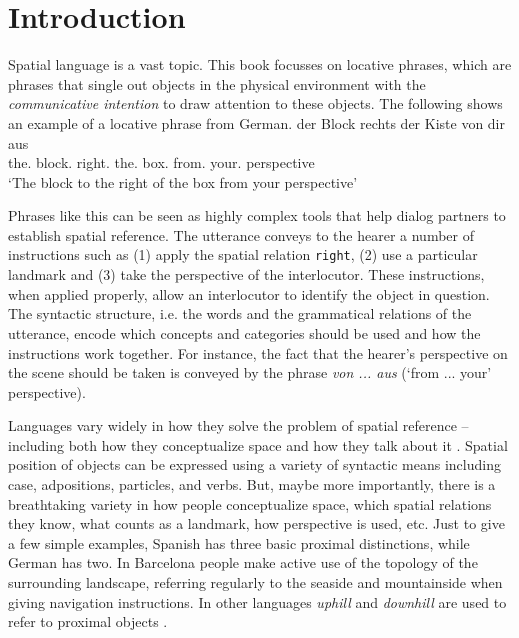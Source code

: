 % 

\chapter{Introduction}
Spatial language is a vast topic. This book focusses on locative phrases, 
which are phrases that single out objects in the physical environment with the 
\emph{communicative intention} 
to draw attention to these objects. The following shows an example
of a locative phrase from German.
\ea
\label{e:der-block-rechts-der-kiste-von-dir-aus}
\gll der Block rechts der Kiste von dir aus \\
the.{\NOM} block.{\NOM} right.{\PREP} the.{\GEN} box.{\GEN} from.{\PREP} your.{\DAT} perspective \\
\glt `The block to the right of the box from your perspective'\\
\z

Phrases like this can be seen as highly complex tools that help dialog 
partners to establish spatial reference. The utterance conveys to the hearer 
a number of instructions such as (1) apply the spatial relation {\footnotesize\tt right},
(2) use a particular landmark and (3) take the perspective of the interlocutor.
These instructions, when applied properly, allow an interlocutor 
to identify the object in question. The syntactic structure, i.e. the words and the 
grammatical relations of the utterance, encode
which concepts and categories should be used and how the instructions work together. 
For instance, the fact that the hearer's perspective on the scene should be taken
is conveyed by the phrase \textit{von ... aus} (`from ... your' perspective).

Languages vary widely in how they solve the problem of spatial reference --
including both how they conceptualize space and how they
talk about it \citep{levinson2006grammars,levinson2003space}. 
Spatial position of objects can be expressed using 
a variety of syntactic means including case, 
adpositions, particles, and verbs. But, maybe more importantly, 
there is a breathtaking variety in how people conceptualize space,
which spatial relations they know, what counts as a landmark, how
perspective is used, etc. Just to give a few simple examples, Spanish has
three basic proximal distinctions, while German has two.
In Barcelona people make active use of the topology of
the surrounding landscape, referring regularly to the
seaside and mountainside when giving navigation instructions. 
In other languages \emph{uphill} and \emph{downhill} 
are used to refer to proximal objects \citep{levinson2003space}.

